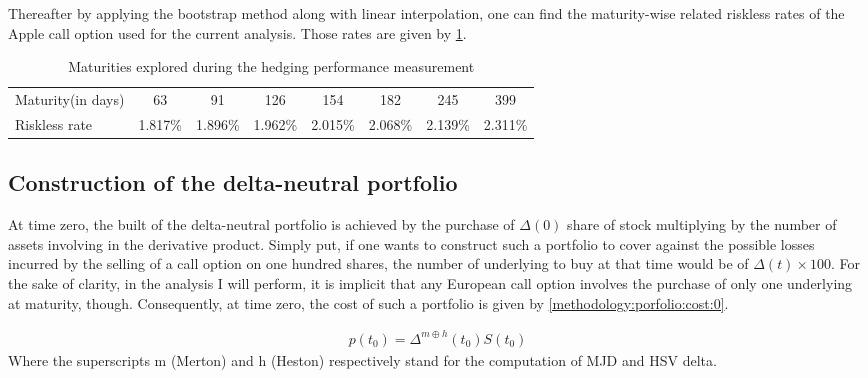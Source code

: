 \documentclass[12pt,a4paper]{report}
\begin{document}
Thereafter by applying the bootstrap method along with linear interpolation, one can find the maturity-wise related riskless rates of the Apple call option used for the current analysis. Those rates are given by \cref{tab:methodology:tbill:maturity}.

\begin{table}[h]
\centering
\begin{tabular}{l|ccccccc}

  \hline
Maturity(in days) & 63   & 91   & 126  & 154    & 182  & 245    & 399 \\ 
Riskless rate     &  1.817\% & 1.896\% & 1.962\% & 2.015\%  & 2.068\%  & 2.139\%   & 2.311\% \\
   \hline
\end{tabular}
\caption{Maturities explored during the hedging performance measurement} 
\label{tab:methodology:tbill:maturity}
\end{table}




\subsection{Construction of the delta-neutral portfolio}
\label{sec:methodology:construction}

At time zero, the built of the delta-neutral portfolio is achieved by the purchase of $\Delta(0)$ share of stock multiplying by the number of assets involving in the derivative product.
Simply put, if one wants to construct such a portfolio to cover against the possible losses incurred by the selling of a call option on one hundred shares, the number of underlying to buy at that time would be of $\Delta(t) \times 100$.
For the sake of clarity, in the analysis I will perform, it is implicit that any European call option involves the purchase of only one underlying at maturity, though.
Consequently, at time zero, the cost of such a portfolio is given by \cref{methodology:porfolio:cost:0}.

\begin{align}
p(t_0) = \Delta^{m \oplus h}(t_0) S(t_0) \label{methodology:porfolio:cost:0}
\end{align}
Where the superscripts m (Merton) and h (Heston) respectively stand for the computation of MJD and HSV delta.
\end{document}
